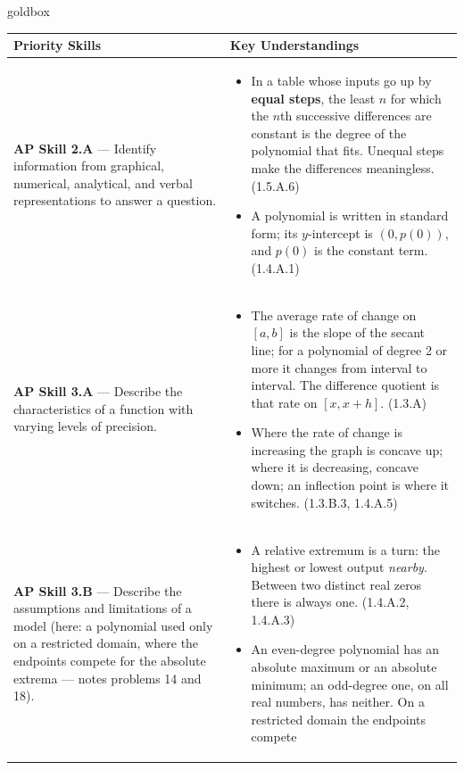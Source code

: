 \documentclass[10pt]{article}
\begin{document}
\renewcommand{\arraystretch}{1.6}
\begin{skillbox}{goldbox}
\begin{tabularx}{\linewidth}{@{}X X@{}}
\textbf{Priority Skills} &
\textbf{Key Understandings} \\
\midrule
\textbf{AP Skill 2.A} --- Identify information from graphical, numerical, analytical, and
verbal representations to answer a question. &
\begin{itemize}[leftmargin=1.2em,itemsep=2pt,topsep=0pt]
  \item In a table whose inputs go up by \textbf{equal steps}, the least $n$ for which the
        $n$th successive differences are constant is the degree of the polynomial that fits.
        Unequal steps make the differences meaningless. (1.5.A.6)
  \item A polynomial is written in standard form; its $y$-intercept is $(0, p(0))$, and $p(0)$
        is the constant term. (1.4.A.1)
\end{itemize} \\
\textbf{AP Skill 3.A} --- Describe the characteristics of a function with varying levels of
precision. &
\begin{itemize}[leftmargin=1.2em,itemsep=2pt,topsep=0pt]
  \item The average rate of change on $[a, b]$ is the slope of the secant line; for a polynomial
        of degree 2 or more it changes from interval to interval. The difference quotient is
        that rate on $[x, x + h]$. (1.3.A)
  \item Where the rate of change is increasing the graph is concave up; where it is decreasing,
        concave down; an inflection point is where it switches. (1.3.B.3, 1.4.A.5)
\end{itemize} \\
\textbf{AP Skill 3.B} --- Describe the assumptions and limitations of a model (here: a
polynomial used only on a restricted domain, where the endpoints compete for the absolute
extrema --- notes problems 14 and 18). &
\begin{itemize}[leftmargin=1.2em,itemsep=2pt,topsep=0pt]
  \item A relative extremum is a turn: the highest or lowest output \emph{nearby}. Between two
        distinct real zeros there is always one. (1.4.A.2, 1.4.A.3)
  \item An even-degree polynomial has an absolute maximum or an absolute minimum; an odd-degree
        one, on all real numbers, has neither. On a restricted domain the endpoints compete

\end{itemize}
\end{tabularx}
\end{skillbox}
\end{document}
